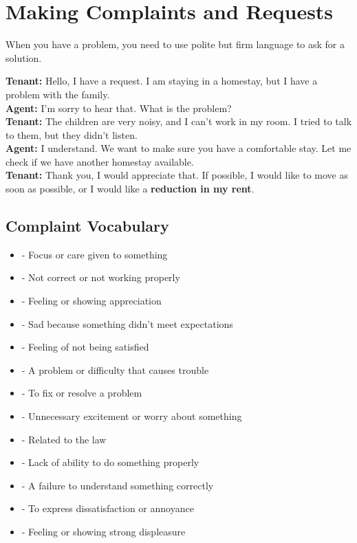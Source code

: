 \section{Making Complaints and Requests}

When you have a problem, you need to use polite but firm language to ask for a solution.

\begin{readingbox}[title=Dialogue: Reporting a Problem]
\textbf{Tenant:} Hello, I have a request. I am staying in a homestay, but I have a problem with the family.\\
\textbf{Agent:} I'm sorry to hear that. What is the problem?\\
\textbf{Tenant:} The children are very noisy, and I can't work in my room. I tried to talk to them, but they didn't listen.\\
\textbf{Agent:} I understand. We want to make sure you have a comfortable stay. Let me check if we have another homestay available.\\
\textbf{Tenant:} Thank you, I would appreciate that. If possible, I would like to move as soon as possible, or I would like a \textbf{reduction in my rent}.
\end{readingbox}

\subsection{Complaint Vocabulary}

\begin{vocabbox}[title=Key Words for Complaints]
\begin{itemize}
    \item {} - Focus or care given to something
    \item {} - Not correct or not working properly
    \item {} - Feeling or showing appreciation
    \item {} - Sad because something didn't meet expectations
    \item {} - Feeling of not being satisfied
    \item {} - A problem or difficulty that causes trouble
    \item {} - To fix or resolve a problem
    \item {} - Unnecessary excitement or worry about something
    \item {} - Related to the law
    \item {} - Lack of ability to do something properly
    \item {} - A failure to understand something correctly
    \item {} - To express dissatisfaction or annoyance
    \item {} - Feeling or showing strong displeasure
\end{itemize}
\end{vocabbox}

